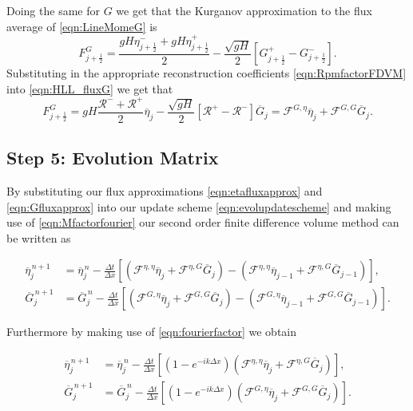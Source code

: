 Doing the same for $G$ we get that the Kurganov approximation to the flux average of \eqref{eqn:LineMomeG} is
\begin{equation}
\label{eqn:HLL_fluxG}
F^{G}_{j+\frac{1}{2}} = \dfrac{ gH \eta ^-_{j+\frac{1}{2}}+ gH \eta ^+_{j+\frac{1}{2}}}{ 2}  - \dfrac{ \sqrt{gH}}{ 2} \left [ G^+_{j+\frac{1}{2}} - G^-_{j+\frac{1}{2}} \right ].
\end{equation}
Substituting in the appropriate reconstruction coefficients \eqref{eqn:RpmfactorFDVM} into \eqref{eqn:HLL_fluxG} we get that
\begin{equation}
\label{eqn:Gfluxapprox}
F^{G}_{j+\frac{1}{2}} = gH \dfrac{\mathcal{R}^- + \mathcal{R}^+ }{ 2} \overline{\eta}_{j} - \dfrac{ \sqrt{gH}}{ 2} \left [  \mathcal{R}^+ -  \mathcal{R}^- \right ] \overline{G}_{j} =  \mathcal{F}^{G,\eta} \overline{\eta}_{j}  + \mathcal{F}^{G,G}\overline{G}_{j}.
\end{equation}

\subsection{Step 5: Evolution Matrix}

By substituting our flux approximations \eqref{eqn:etafluxapprox} and \eqref{eqn:Gfluxapprox} into our update scheme \eqref{eqn:evolupdatescheme} and making use of \eqref{eqn:Mfactorfourier} our second order finite difference volume method can be written as

\begin{align*}
\overline{\eta}_{j}^{\,n + 1} &=  \overline{\eta}^{\,n }_{j} - \frac{\Delta t}{\Delta x}  \left[ \left(\mathcal{F}^{\eta,\eta} \overline{\eta}_j  + \mathcal{F}^{\eta,G} \overline{G}_j \right) - \left(\mathcal{F}^{\eta,\eta} \overline{\eta}_{j-1}  + \mathcal{F}^{\eta,G} \overline{G}_{j-1} \right)  \right], \\
 \overline{G}^{\,n + 1}_{j} &= \overline{G}^{\,n }_{j} -\frac{\Delta t}{\Delta x}  \left[ \left(  \mathcal{F}^{G,\eta} \overline{\eta}_{j}  + \mathcal{F}^{G,G} \overline{G}_j \right) - \left(  \mathcal{F}^{G,\eta} \overline{\eta}_{j-1}  + \mathcal{F}^{G,G} \overline{G}_{j-1} \right) \right].
\end{align*}

	
Furthermore by making use of \eqref{eqn:fourierfactor} we obtain
	
\begin{align*}
\overline{\eta}_{j}^{\,n + 1} &=  \overline{\eta}^{\,n }_{j} - \frac{\Delta t}{\Delta x}  \left[ \left(1 - e^{-ik\Delta x}\right) \left(\mathcal{F}^{\eta,\eta} \overline{\eta}_j  + \mathcal{F}^{\eta,G} \overline{G}_j \right) \right], \\
\overline{G}^{\,n + 1}_{j} &= \overline{G}^{\,n }_{j} -\frac{\Delta t}{\Delta x}  \left[ \left(1 - e^{-ik\Delta x}\right)\left(  \mathcal{F}^{G,\eta} \overline{\eta}_{j}  + \mathcal{F}^{G,G} \overline{G}_j \right) \right].
\end{align*}



